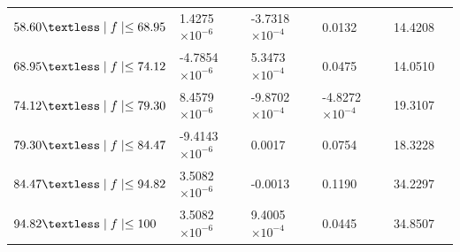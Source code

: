 \documentclass[journal]{IEEEtran}
\begin{document}
\begin{table}[h!]
\begin{tabular}{|C{4cm}|C{3cm}|C{3cm}|C{3cm}|C{3cm}|m{0cm}}
		$58.60\textless \mid f\mid \leq 68.95$ & 1.4275  $\times 10^{-6}$  & -3.7318 $\times 10^{-4}$ & 0.0132 					& 14.4208 &\\ 
		$68.95\textless \mid f\mid \leq 74.12$ & -4.7854 $\times 10^{-6}$  & 5.3473 $\times 10^{-4}$  & 0.0475 					& 14.0510 &\\ 
		$74.12\textless \mid f\mid \leq 79.30$ & 8.4579  $\times 10^{-6}$  & -9.8702 $\times 10^{-4}$ & -4.8272 $\times 10^{-4}$& 19.3107 &\\ 
		$79.30\textless \mid f\mid \leq 84.47$ & -9.4143 $\times 10^{-6}$  & 0.0017 				  & 0.0754 					& 18.3228 &\\ 
		$84.47\textless \mid f\mid \leq 94.82$ & 3.5082 $\times 10^{-6}$   & -0.0013 				  & 0.1190					& 34.2297 &\\ 
		$94.82\textless \mid f\mid \leq 100$   & 3.5082 $\times 10^{-6}$   & 9.4005 $\times 10^{-4}$  & 0.0445 					& 34.8507 &\\ 
	\end{tabular}
\end{table}
\end{document}
